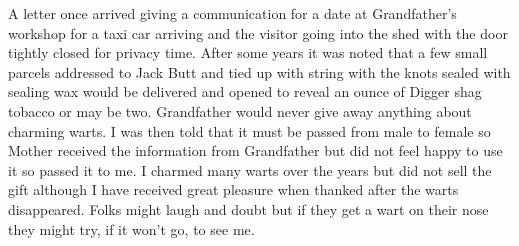 A letter once arrived giving a communication for a date at Grandfather's
workshop for a taxi car arriving and the visitor going into the shed with the
door tightly closed for privacy time. After some years it was noted that a few
small parcels addressed to Jack Butt and tied up with string with the knots
sealed with sealing wax would be delivered and opened to reveal an ounce of
Digger shag tobacco or may be two. Grandfather would never give away anything
about charming warts. I was then told that it must be passed from male to
female so Mother received the information from Grandfather but did not feel
happy to use it so passed it to me. I charmed many warts over the years but did
not sell the gift although I have received great pleasure when thanked after
the warts disappeared. Folks might laugh and doubt but if they get a wart on
their nose they might try, if it won't go, to see me.

